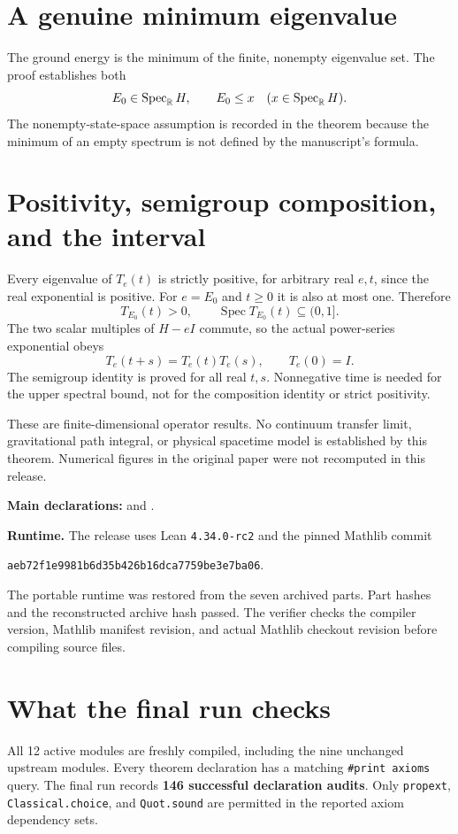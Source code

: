\documentclass[10pt,letterpaper]{article}
\newcommand{\Spec}{\operatorname{Spec}}\newcommand{\Ran}{\operatorname{Ran}}
\newcommand{\code}[1]{\texttt{\small #1}}
\newcommand{\pageheading}[2]{\vspace*{2pt}{\small\color{ink}\textsc{#1}}\par\vspace{2pt}{\Large\bfseries #2}\par\vspace{4pt}}
\begin{document}
\section*{A genuine minimum eigenvalue}
The ground energy is the minimum of the finite, nonempty eigenvalue set. The proof establishes both
\[
E_0\in\Spec_\R H,\qquad E_0\le x\quad(x\in\Spec_\R H).
\]
The nonempty-state-space assumption is recorded in the theorem because the minimum of an empty spectrum is not defined by the manuscript's formula.

\section*{Positivity, semigroup composition, and the interval}
Every eigenvalue of $T_e(t)$ is strictly positive, for arbitrary real $e,t$, since the real exponential is positive. For $e=E_0$ and $t\ge0$ it is also at most one. Therefore
\[
\boxed{T_{E_0}(t)>0,\qquad \Spec T_{E_0}(t)\subseteq(0,1].}
\]
The two scalar multiples of $H-eI$ commute, so the actual power-series exponential obeys
\[
\boxed{T_e(t+s)=T_e(t)T_e(s),\qquad T_e(0)=I.}
\]
The semigroup identity is proved for all real $t,s$. Nonnegative time is needed for the upper spectral bound, not for the composition identity or strict positivity.

These are finite-dimensional operator results. No continuum transfer limit, gravitational path integral, or physical spacetime model is established by this theorem. Numerical figures in the original paper were not recomputed in this release.

\textbf{Main declarations:}  and .

\newpage
\pageheading{Execution and trust}{Cumulative verification evidence}
\textbf{Runtime.} The release uses Lean \code{4.34.0-rc2} and the pinned Mathlib commit
\begin{center}\code{aeb72f1e9981b6d35b426b16dca7759be3e7ba06}.\end{center}
The portable runtime was restored from the seven archived parts. Part hashes and the reconstructed archive hash passed. The verifier checks the compiler version, Mathlib manifest revision, and actual Mathlib checkout revision before compiling source files.

\section*{What the final run checks}
All 12 active modules are freshly compiled, including the nine unchanged upstream modules. Every theorem declaration has a matching \code{\#print axioms} query. The final run records \textbf{146 successful declaration audits}. Only \code{propext}, \code{Classical.choice}, and \code{Quot.sound} are permitted in the reported axiom dependency sets.
\end{document}
